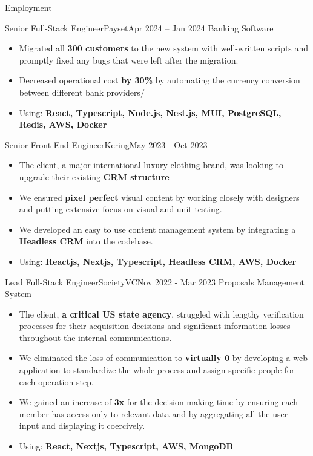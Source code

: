 \documentclass[]{mcdowellcv}
\begin{document}
	\makeheader
	
	\begin{cvsection}{Employment}
		\begin{cvsubsection}{Senior Full-Stack Engineer}{Payset}{Apr 2024 -- Jan 2024}
			Banking Software
			\begin{itemize}
				\item Migrated all \textbf{300 customers} to the new system with well-written scripts and promptly fixed any bugs that were left after the migration.
				\item Decreased operational cost \textbf{by 30\%} by automating the currency conversion between different bank providers/
				\item Using: \textbf{React, Typescript, Node.js, Nest.js, MUI, PostgreSQL, Redis, AWS, Docker}
			\end{itemize}
		\end{cvsubsection}

		\begin{cvsubsection}{Senior Front-End Engineer}{Kering}{May 2023 - Oct 2023}
			\begin{itemize}
				\item The client, a major international luxury clothing brand, was looking to upgrade their existing \textbf{CRM structure}
				\item We ensured \textbf{pixel perfect} visual content by working closely with designers and putting extensive focus on visual and unit testing.
				\item We developed an easy to use content management system by integrating a \textbf{Headless CRM} into the codebase.
				\item Using: \textbf{Reactjs, Nextjs, Typescript, Headless CRM, AWS, Docker}
			\end{itemize}
		\end{cvsubsection}

		\begin{cvsubsection}{Lead Full-Stack Engineer}{SocietyVC}{Nov 2022 - Mar 2023}
			Proposals Management System
			\begin{itemize}
				\item The client, \textbf{a critical US state agency}, struggled with lengthy verification processes for their acquisition decisions and significant information losses throughout the internal communications.
				\item We eliminated the loss of communication to \textbf{virtually 0} by developing a web application to standardize the whole process and assign specific people for each operation step.
				\item We gained an increase of \textbf{3x} for the decision-making time by ensuring each member has access only to relevant data and by aggregating all the user input and displaying it coercively.
				\item Using: \textbf{React, Nextjs, Typescript, AWS, MongoDB}
			\end{itemize}
		\end{cvsubsection}



\end{cvsection}
\end{document}
